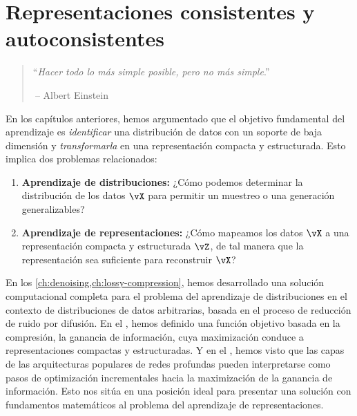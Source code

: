 \documentclass[../../book-main_es.tex]{subfiles}
\begin{document}
\chapter{Representaciones consistentes y autoconsistentes}
\label{ch:consistent-representations}

\begin{quote}
    \hfill  ``{\em Hacer todo lo más simple posible,
    pero no más simple}.''

    $~$\hfill -- Albert Einstein
\end{quote}

\vspace{5mm}

En los capítulos anteriores, hemos argumentado que el objetivo fundamental del aprendizaje es
\textit{identificar} una distribución de datos con un soporte de baja dimensión y
\textit{transformarla} en una representación compacta y estructurada. Esto implica
dos problemas relacionados:
\begin{enumerate}
    \item \textbf{Aprendizaje de distribuciones:} ¿Cómo podemos determinar la
        distribución
        de los datos $\vX$ para permitir un muestreo o una generación generalizables?
    \item \textbf{Aprendizaje de representaciones:} ¿Cómo mapeamos los datos $\vX$ a
        una representación compacta y estructurada $\vZ$, de tal manera que la
        representación
        sea suficiente para reconstruir $\vX$?
\end{enumerate}
En los \cref{ch:denoising,ch:lossy-compression}, hemos desarrollado una solución computacional completa
para
el problema del aprendizaje de distribuciones en el contexto de distribuciones de datos arbitrarias, basada en el
proceso de reducción de ruido por difusión. %
En el , hemos definido una
función objetivo basada en la compresión,
la ganancia de información, cuya maximización conduce a representaciones compactas y
estructuradas.
Y en el , hemos visto que las capas de las arquitecturas populares de redes profundas
pueden interpretarse como pasos de optimización incrementales
hacia la maximización de la ganancia de información. Esto nos sitúa en una posición ideal para presentar
una solución con fundamentos matemáticos al problema del aprendizaje de representaciones.
\end{document}
